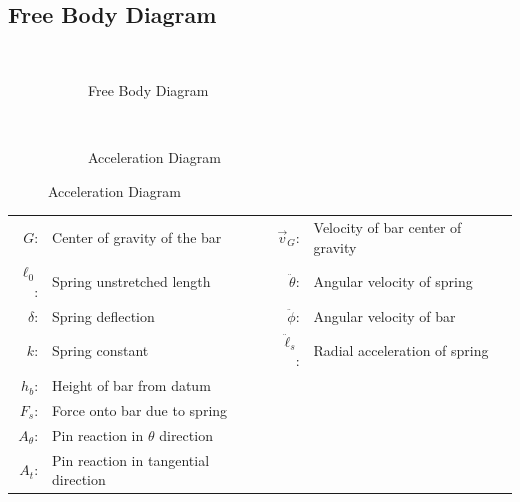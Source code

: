 \documentclass[12pt]{report}
\begin{document}
\begin{flushleft}
\section{Free Body Diagram}
\begin{figure}[!htp]
  \caption{Acceleration and Free Body Diagrams}
   \begin{minipage}[c]{.5\textwidth}
     \begin{subfigure}{\textwidth}
       \center
       \\
      \vspace{2ex}
      \caption{Free Body Diagram}
      \label{fbd}
      \end{subfigure}
   \end{minipage}%
   \begin{minipage}[c]{.5\textwidth}
     \begin{subfigure}{\textwidth}
       \center
        \\
       \vspace{3ex}
       \caption{Acceleration Diagram}
       \label{ad}
    \end{subfigure}
   \end{minipage}
\end{figure}
  \center
  \begin{tabular}{rl@{\hskip .5in}rl}
  $G$:&Center of gravity of the bar &$\vec{v}_G$:& Velocity of bar center of gravity\\
  $\ell_0$:& Spring unstretched length  &$\ddot{\theta}$:& Angular velocity of spring \\
  $\delta$:& Spring deflection &$\ddot{\phi}$:& Angular velocity of bar\\
  $k$:& Spring constant &$\ddot{\ell}_s$:& Radial acceleration of spring \\
  $h_{b}$:& Height of bar from datum \\
  $F_s$:& Force onto bar due to spring\\
  $A_{\theta}$:& Pin reaction in $\theta$ direction\\
  $A_{t}$:& Pin reaction in tangential direction \\
\end{tabular}


\end{flushleft}
\end{document}
